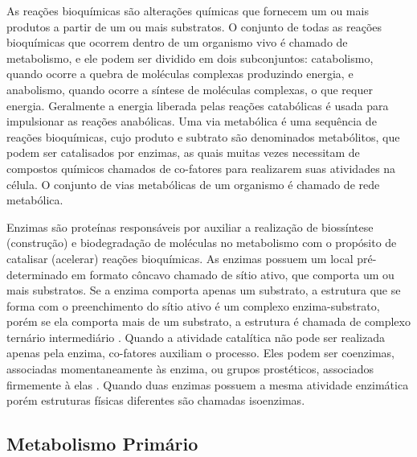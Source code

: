
\indent As reações bioquímicas são alterações químicas que fornecem um ou mais produtos a partir de um ou mais substratos. O conjunto de todas as reações bioquímicas que ocorrem dentro de um organismo vivo é chamado de metabolismo, e ele podem ser dividido em dois subconjuntos: catabolismo, quando ocorre a quebra de moléculas complexas produzindo energia, e anabolismo, quando ocorre a síntese de moléculas complexas, o que requer energia. Geralmente a energia liberada pelas reações catabólicas é usada para impulsionar as reações anabólicas\cite{carterClass}. Uma via metabólica é uma sequência de reações bioquímicas, cujo produto e subtrato são denominados metabólitos, que podem ser catalisados por enzimas, as quais muitas vezes necessitam de compostos químicos chamados de co-fatores para realizarem suas atividades na célula. O conjunto de vias metabólicas de um organismo é chamado de rede metabólica.


\indent Enzimas são proteínas responsáveis por auxiliar a realização de biossíntese (construção) e biodegradação de moléculas no metabolismo com o propósito de catalisar (acelerar) reações bioquímicas. As enzimas possuem um local pré-determinado em formato côncavo chamado de sítio ativo, que comporta um ou mais substratos. Se a enzima comporta apenas um substrato, a estrutura que se forma com o preenchimento do sítio ativo é um complexo enzima-substrato, porém se ela comporta mais de um substrato, a estrutura é chamada de complexo ternário intermediário \cite{Cap2schomburg}. Quando a atividade catalítica não pode ser realizada apenas pela enzima, co-fatores auxiliam o processo. Eles podem ser coenzimas, associadas momentaneamente às enzima, ou grupos prostéticos, associados firmemente à elas \cite{Cap2schomburg}. Quando duas enzimas possuem a mesma atividade enzimática porém estruturas físicas diferentes são chamadas isoenzimas\cite{Cap2schomburg}.


\subsection{Metabolismo Primário}


